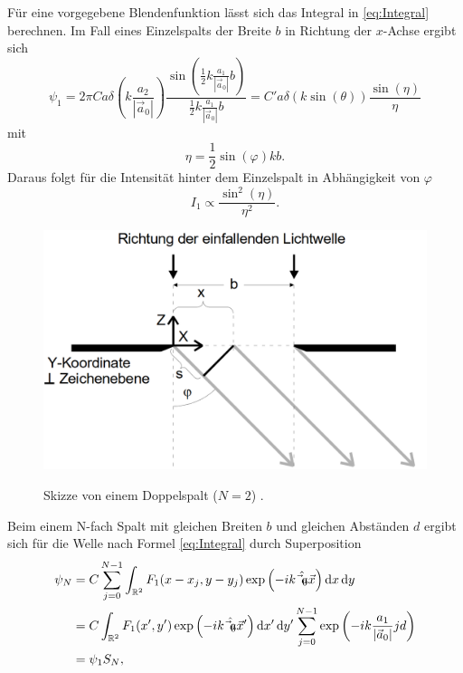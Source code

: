 Für eine vorgegebene Blendenfunktion lässt sich das Integral in \eqref{eq:Integral} berechnen. Im Fall eines Einzelspalts der Breite $b$ in Richtung der $x$-Achse ergibt sich
\begin{equation}
	\psi_1 = 2 \pi C a \delta\left(k \frac{a_2}{|\vec{a}_0|}\right) \frac{\sin\left(\frac{1}{2} k \frac{a_1}{|\vec{a}_0|} b\right)}{\frac{1}{2} k \frac{a_1}{|\vec{a}_0|} b} = C' a \delta(k \sin(\theta)) \frac{\sin(\eta)}{\eta}
\end{equation} 
mit 
\begin{equation}
	\eta = \frac{1}{2} \sin(\varphi) k b .
\end{equation}
Daraus folgt für die Intensität hinter dem Einzelspalt in Abhängigkeit von $\varphi$
\begin{equation}
	I_1 \propto \frac{\sin^2(\eta)}{\eta^2}\text{.} \label{eq:1Spalt}
\end{equation}
\begin{figure}
	\centering
	\caption{Skizze von einem Doppelspalt ($N=2$) \cite{V406}.}
	\includegraphics[width=\linewidth-150pt,height=\textheight-150pt,keepaspectratio]{content/images/Einzelspalt.png}
	\label{fig:Doppel}
\end{figure}
Beim einem N-fach Spalt mit gleichen Breiten $b$ und gleichen Abständen $d$ ergibt sich für die Welle nach Formel \eqref{eq:Integral} durch Superposition
\begin{equation}
\begin{split}
	\psi_{N} &=  C \sum\limits_{j=0}^{N-1} \int_{\mathbb{R}^2} F_1(x-x_j,y-y_j) \exp\left(-i k \hat{\vec{a}_0} \vec{x}\right) \mathop{}\!\mathrm{d} x \mathop{}\!\mathrm{d} y \\
	&= C \int_{\mathbb{R}^2} F_1(x',y') \exp\left(-i k \hat{\vec{a}_0} \vec{x}'\right) \mathop{}\!\mathrm{d} x' \mathop{}\!\mathrm{d} y'  \sum\limits_{j=0}^{N-1} \exp\left(-i k \frac{a_1}{|\vec{a}_0|} j d \right) \\
	&= \psi_1 S_N,
\end{split}
\end{equation}
